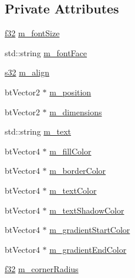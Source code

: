 \subsection*{Private Attributes}
\begin{DoxyCompactItemize}
\item 
\mbox{\hyperlink{_util_8h_a5f6906312a689f27d70e9d086649d3fd}{f32}} \mbox{\hyperlink{classnjli_1_1_button_h_u_d_ae8dc759bddad5462c7a0928f109977e6}{m\+\_\+font\+Size}}
\item 
std\+::string \mbox{\hyperlink{classnjli_1_1_button_h_u_d_a4301c64a091ff9abf32f6a6add14593c}{m\+\_\+font\+Face}}
\item 
\mbox{\hyperlink{_util_8h_aa62c75d314a0d1f37f79c4b73b2292e2}{s32}} \mbox{\hyperlink{classnjli_1_1_button_h_u_d_aa17394aa8dfdb299d76ac1effd5bbbd5}{m\+\_\+align}}
\item 
bt\+Vector2 $\ast$ \mbox{\hyperlink{classnjli_1_1_button_h_u_d_a9b6b903e46fb1369f15560b2bb710336}{m\+\_\+position}}
\item 
bt\+Vector2 $\ast$ \mbox{\hyperlink{classnjli_1_1_button_h_u_d_ac09c838f0985be02e905d1476d698e9b}{m\+\_\+dimensions}}
\item 
std\+::string \mbox{\hyperlink{classnjli_1_1_button_h_u_d_a6a83ddc2b584f7e83191dbfb9024df1c}{m\+\_\+text}}
\item 
bt\+Vector4 $\ast$ \mbox{\hyperlink{classnjli_1_1_button_h_u_d_a1162e0793f09db4e3e5d62d93b967598}{m\+\_\+fill\+Color}}
\item 
bt\+Vector4 $\ast$ \mbox{\hyperlink{classnjli_1_1_button_h_u_d_abbaaf649b3c55c5644cd59827caa00a9}{m\+\_\+border\+Color}}
\item 
bt\+Vector4 $\ast$ \mbox{\hyperlink{classnjli_1_1_button_h_u_d_ac2561e2838776df33d2c0eff6aa3e145}{m\+\_\+text\+Color}}
\item 
bt\+Vector4 $\ast$ \mbox{\hyperlink{classnjli_1_1_button_h_u_d_a2acbd93bdfa31be57d9a00fdd411e735}{m\+\_\+text\+Shadow\+Color}}
\item 
bt\+Vector4 $\ast$ \mbox{\hyperlink{classnjli_1_1_button_h_u_d_ad252ad621b7f1f8903773f3167da7cac}{m\+\_\+gradient\+Start\+Color}}
\item 
bt\+Vector4 $\ast$ \mbox{\hyperlink{classnjli_1_1_button_h_u_d_af633bca7b8c4643687c2db6efee9c0e1}{m\+\_\+gradient\+End\+Color}}
\item 
\mbox{\hyperlink{_util_8h_a5f6906312a689f27d70e9d086649d3fd}{f32}} \mbox{\hyperlink{classnjli_1_1_button_h_u_d_ac098deb37ba7aff504d4d65c5c243fb9}{m\+\_\+corner\+Radius}}
\end{DoxyCompactItemize}
